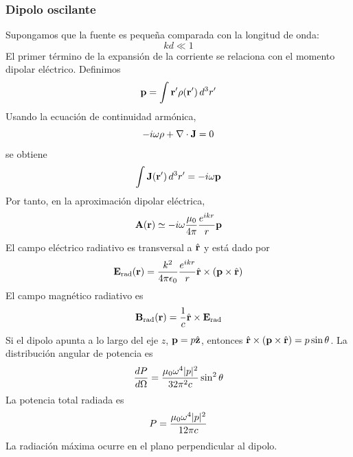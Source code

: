 \documentclass[]{article}
\numberwithin{equation}{section}
\begin{document}
\subsubsection{Dipolo oscilante}
Supongamos que la fuente es pequeña comparada con la longitud de onda:
\begin{equation*}
	kd \ll 1
\end{equation*}
El primer término de la expansión de la corriente se relaciona con el momento dipolar eléctrico. Definimos
\begin{equation}
	\mathbf{p} = \int \mathbf{r}' \rho(\mathbf{r}') \, d^3 r'
\end{equation}
Usando la ecuación de continuidad armónica,
\begin{equation*}
	-i \omega \rho + \nabla\cdot\mathbf{J} = 0
\end{equation*}
se obtiene
\begin{equation}
	\int \mathbf{J}(\mathbf{r}') \, d^3 r' = -i\omega\mathbf{p} 
\end{equation}
Por tanto, en la aproximación dipolar eléctrica,
\begin{equation}
	\n{A}(\rv) \simeq -i\omega \ku \frac{e^{ikr}}{r} \n{p}
\end{equation}
El campo eléctrico radiativo es transversal a $\hat{\mathbf{r}}$ y está dado por
\begin{equation}
	\n{E}_\mathrm{rad} (\rv) = \ke[k^2] \frac{e^{ikr}}{r} \rhat\times(\n{p}\times\rhat)
\end{equation}
El campo magnético radiativo es
\begin{equation}
	\mathbf{B}_\mathrm{rad} (\mathbf{r}) =\frac{1}{c} \hat{\mathbf{r}}\times\mathbf{E}_\mathrm{rad}
\end{equation}
Si el dipolo apunta a lo largo del eje $z$, $\mathbf{p} = p \hat{\mathbf{z}}$, entonces $\hat{\mathbf{r}}\times(\mathbf{p}\times\hat{\mathbf{r}}) = p \sin\theta$. La distribución angular de potencia es
\begin{equation}
	\dfrac{d P}{d \Omega} = \frac{\mu_{0}\omega^4 |p|^2}{32\pi^2 c} \sin^2\theta
\end{equation}
La potencia total radiada es
\begin{equation}
	P = \frac{\mu_{0}\omega^4 |p|^2}{12 \pi c}
\end{equation}
La radiación máxima ocurre en el plano perpendicular al dipolo.
\end{document}

